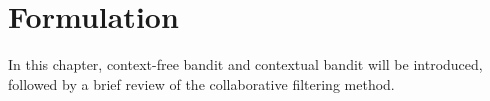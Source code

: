 \chapter{Formulation}
In this chapter, context-free bandit and contextual bandit will be introduced, followed by a brief review of the collaborative filtering method.




